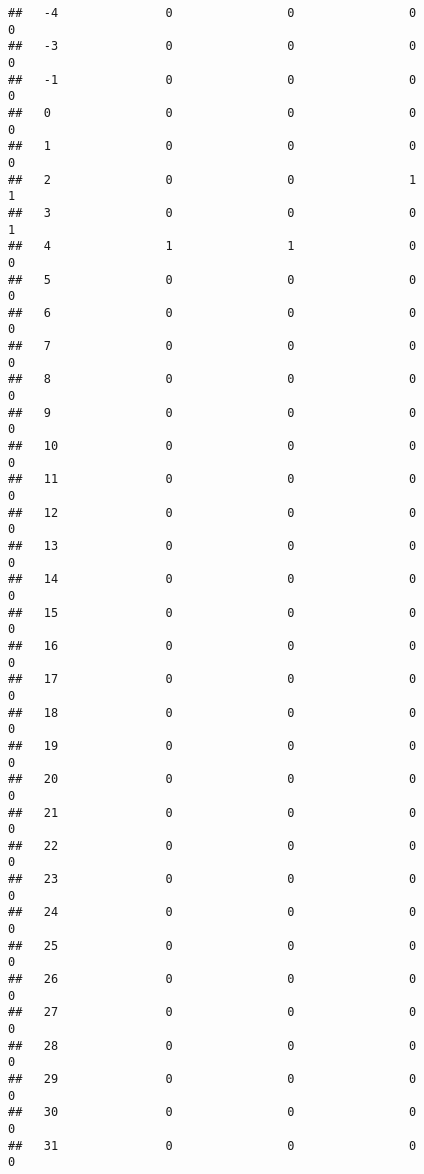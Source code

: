 \documentclass[]{article}
\begin{document}
\begin{verbatim}
##   -4               0                0                0                0
##   -3               0                0                0                0
##   -1               0                0                0                0
##   0                0                0                0                0
##   1                0                0                0                0
##   2                0                0                1                1
##   3                0                0                0                1
##   4                1                1                0                0
##   5                0                0                0                0
##   6                0                0                0                0
##   7                0                0                0                0
##   8                0                0                0                0
##   9                0                0                0                0
##   10               0                0                0                0
##   11               0                0                0                0
##   12               0                0                0                0
##   13               0                0                0                0
##   14               0                0                0                0
##   15               0                0                0                0
##   16               0                0                0                0
##   17               0                0                0                0
##   18               0                0                0                0
##   19               0                0                0                0
##   20               0                0                0                0
##   21               0                0                0                0
##   22               0                0                0                0
##   23               0                0                0                0
##   24               0                0                0                0
##   25               0                0                0                0
##   26               0                0                0                0
##   27               0                0                0                0
##   28               0                0                0                0
##   29               0                0                0                0
##   30               0                0                0                0
##   31               0                0                0                0

\end{verbatim}
\end{document}
